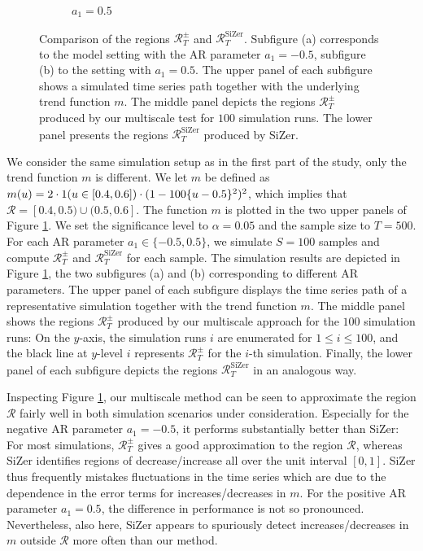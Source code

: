 \begin{figure}[t]
\begin{subfigure}{.5\textwidth}
\caption{$a_1 = 0.5$}
\end{subfigure}
\caption{Comparison of the regions $\mathcal{R}_T^\pm$ and $\mathcal{R}_T^{\text{SiZer}}$. Subfigure (a) corresponds to the model setting with the AR parameter $a_1 = -0.5$, subfigure (b) to the setting with $a_1 = 0.5$. The upper panel of each subfigure shows a simulated time series path together with the underlying trend function $m$. The middle panel depicts the regions $\mathcal{R}_T^\pm$ produced by our multiscale test for $100$ simulation runs. The lower panel presents the regions $\mathcal{R}_T^{\text{SiZer}}$ produced by SiZer.}  
\label{fig:comparison_SiZer}
\end{figure}


We consider the same simulation setup as in the first part of the study, only the trend function $m$ is different. We let $m$ be defined as $m(u) = 2 \cdot 1(u \in [0.4,0.6]) \cdot (1 - 100 \{u-0.5\}^2)^2$, which implies that $\mathcal{R} = [0.4,0.5) \cup (0.5,0.6]$. The function $m$ is plotted in the two upper panels of Figure \ref{fig:comparison_SiZer}. We set the significance level to $\alpha= 0.05$ and the sample size to $T=500$. For each AR parameter $a_1 \in \{ -0.5,0.5 \}$, we simulate $S=100$ samples and compute $\mathcal{R}_T^\pm$ and $\mathcal{R}_T^{\text{SiZer}}$ for each sample. The simulation results are depicted in Figure \ref{fig:comparison_SiZer}, the two subfigures (a) and (b) corresponding to different AR parameters. The upper panel of each subfigure displays the time series path of a representative simulation together with the trend function $m$. The middle panel shows the regions $\mathcal{R}_T^\pm$ produced by our multiscale approach for the $100$ simulation runs: On the $y$-axis, the simulation runs $i$ are enumerated for $1 \le i \le 100$, and the black line at $y$-level $i$ represents $\mathcal{R}_T^\pm$ for the $i$-th simulation. Finally, the lower panel of each subfigure depicts the regions $\mathcal{R}_T^{\text{SiZer}}$ in an analogous way. 


Inspecting Figure \ref{fig:comparison_SiZer}, our multiscale method can be seen to approximate the region $\mathcal{R}$ fairly well in both simulation scenarios under consideration. Especially for the negative AR parameter $a_1 = -0.5$, it performs substantially better than SiZer: For most simulations, $\mathcal{R}_T^\pm$ gives a good approximation to the region $\mathcal{R}$, whereas SiZer identifies regions of decrease/increase all over the unit interval $[0, 1]$. SiZer thus frequently mistakes fluctuations in the time series which are due to the dependence in the error terms for increases/decreases in $m$. For the positive AR parameter $a_1 = 0.5$, the difference in performance is not so pronounced. Nevertheless, also here, SiZer appears to spuriously detect increases/decreases in $m$ outside $\mathcal{R}$ more often than our method. 


